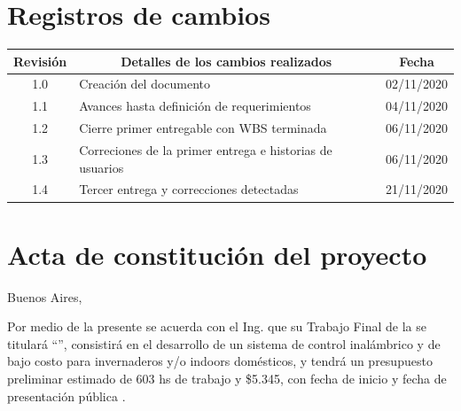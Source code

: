 \documentclass[11pt]{charter}
\begin{document}
\maketitle
\thispagestyle{empty}
\pagebreak


\thispagestyle{empty}
{\setlength{\parskip}{0pt}
\tableofcontents{}
}
\pagebreak


\section{Registros de cambios}
\label{sec:registro}


\begin{table}[ht]
\label{tab:registro}
\centering
\begin{tabularx}{\linewidth}{@{}|c|X|c|@{}}
\hline
\rowcolor[HTML]{C0C0C0} 
Revisión & \multicolumn{1}{c|}{\cellcolor[HTML]{C0C0C0}Detalles de los cambios realizados} & Fecha      \\ \hline
1.0      & Creación del documento                                          & 02/11/2020 \\ \hline
1.1      & Avances hasta definición de requerimientos                                          & 04/11/2020 \\ \hline
1.2      & Cierre primer entregable con WBS terminada
& 06/11/2020 \\ \hline
1.3      & Correciones de la primer entrega e historias de usuarios
& 06/11/2020 \\ \hline
1.4      & Tercer entrega y correcciones detectadas
& 21/11/2020 \\ \hline
\end{tabularx}
\end{table}

\pagebreak



\section{Acta de constitución del proyecto}
\label{sec:acta}

\begin{flushright}
Buenos Aires, \fechaInicioName
\end{flushright}

\vspace{2cm}

Por medio de la presente se acuerda con el Ing. \authorname\hspace{1px} que su Trabajo Final de la \degreename\hspace{1px} se titulará ``\ttitle'', consistirá en el desarrollo de un sistema de control inalámbrico y de bajo costo para invernaderos y/o indoors domésticos, y tendrá un presupuesto preliminar estimado de 603 hs de trabajo y {\$5.345}, con fecha de inicio \fechaInicioName\hspace{1px} y fecha de presentación pública \fechaFinalName.
\end{document}
